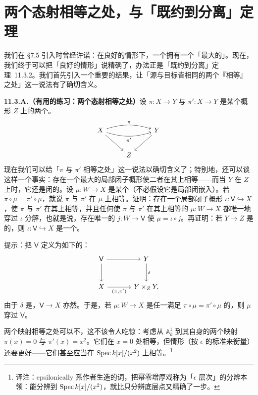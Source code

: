 
\section{两个态射相等之处，与「既约到分离」定理}

我们在 \S7.5 引入\trRationalMap{}时曾经许诺：在良好的情形下，一个\trRationalMap{}拥有一个「最大的\trDomainOfDefinition」。现在，我们终于可以把「良好的情形」说精确了，办法正是「既约到分离」定理~11.3.2。我们首先引入一个重要的结果，让「源与目标皆相同的两个\trMorphism{}『相等』之处」这一说法有了确切含义。

\textbf{11.3.A.（有用的练习：两个态射相等之处）}\quad 设 $\pi\colon X\to Y$ 与 $\pi'\colon X\to Y$ 是某个概形 $Z$ 上的两个\trMorphism。
\[
\begin{tikzcd}[row sep=2.2em]
X \ar[rr, bend left=17, "\pi"] \ar[rr, bend right=17, "\pi'"'] \ar[dr] & & Y \ar[dl] \\
& Z &
\end{tikzcd}
\]
现在我们可以给「$\pi$ 与 $\pi'$ 相等之处」这一说法以确切含义了；特别地，还可以谈这样一个事实：存在一个最大的局部闭子概形使二者在其上相等——而当 $Y$ 在 $Z$ 上\trSeparated{}时，它还是闭的。设 $\mu\colon W\to X$ 是某个\trMorphism（不必假设它是局部闭嵌入）。若 $\pi\circ\mu=\pi'\circ\mu$，就说 $\pi$ 与 $\pi'$ 在 $\mu$ 上相等。证明：存在一个局部闭子概形 $\iota\colon\mathsf{V}\hookrightarrow X$，使 $\pi$ 与 $\pi'$ 在其上相等，并且任何使 $\pi$ 与 $\pi'$ 在其上相等的\trMorphism{} $\mu\colon W\to X$ 都唯一地穿过 $\iota$ 分解，也就是说，存在唯一的 $j\colon W\to\mathsf{V}$ 使 $\mu=\iota\circ j$。再证明：若 $Y\to Z$ 是\trSeparated{}的，则 $\iota\colon\mathsf{V}\hookrightarrow X$ 是一个\trClosedEmbedding。

提示：把 $\mathsf{V}$ 定义为如下的\trFiberProduct{}：
\[
\begin{tikzcd}[row sep=2.6em, column sep=3.4em]
\mathsf{V} \ar[r] \ar[d] & Y \ar[d, "\delta"] \\
X \ar[r, "{(\pi,\pi')}"'] & Y\times_Z Y.
\end{tikzcd}
\]
由于 $\delta$ 是\trLocallyClosedEmbedding，$\mathsf{V}\to X$ 亦然。于是，若 $\mu\colon W\to X$ 是任一满足 $\pi\circ\mu=\pi'\circ\mu$ 的\trMorphism，则 $\mu$ 穿过 $\mathsf{V}$。

两个映射相等之处可以不\trReduced{}，这不该令人吃惊：考虑从 $\mathbb{A}^1_k$ 到其自身的两个映射 $\pi(x)=0$ 与 $\pi'(x)=x^2$。它们在 $x=0$ 处相等，但情形（按 $\epsilon$ 的标准来衡量）还要更好——它们甚至应当在 $\operatorname{Spec} k[x]/(x^2)$ 上相等。\footnote{译注：epsilonically 系作者生造的词，把幂零增厚戏称为「$\epsilon$ 层次」的分辨本领：能分辨到 $\operatorname{Spec} k[x]/(x^2)$，就比只分辨底层点又精确了一步。}

